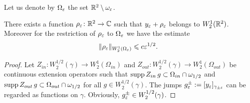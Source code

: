 Let us denote by $\Omega_\varepsilon$ the set $\mathbb R^2\setminus\omega_\varepsilon$.
\begin{lemma}\label{PropW21Corrector}
There exists a function $\rho_\varepsilon\colon \mathbb R^2\to \mathbb C$ such that $y_\varepsilon+\rho_\varepsilon$ belongs to $W_2^1(\mathbb R^2)$. Moreover for the restriction of $\rho_\varepsilon$ to $\Omega_\varepsilon$  we have the estimate
\begin{equation}\label{EstRhoEps}
\|\rho_\varepsilon\|_{W_2^1(\Omega_\varepsilon)}\leqslant c \varepsilon^{1/2}.
\end{equation}
\end{lemma}

\begin{proof}
Let $Z_{in}\colon W_2^{1/2}(\gamma)\to W_2^1(\Omega_{in})$ and
    $Z_{out}\colon W_2^{1/2}(\gamma)\to W_2^1(\Omega_{out})$
be  continuous extension operators such that
$\mathop{\rm supp} Z_{in} \,g\subset \Omega_{in}\cap \omega_{1/2}$ and
$\mathop{\rm supp} Z_{out} \,g\subset \Omega_{out}\cap \omega_{1/2}$
for all $g\in W_2^{1/2}(\gamma)$. The jumps $g_\varepsilon^\pm:=[y_\varepsilon]_{\gamma_{\pm\varepsilon}}$ can be regarded as  functions on $\gamma$. Obviously, $g_\varepsilon^\pm\in W_2^{1/2}(\gamma)$.





\end{proof}

